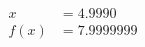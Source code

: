 \documentclass[preview]{standalone}
\begin{document}
\begin{align*}
x &= 4.9990\\f(x) &= 7.9999999
\end{align*}
\end{document}
